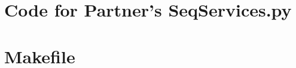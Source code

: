 \documentclass[12pt]{article}
\begin{document}
\noindent 

\newpage

\section{Code for Partner's SeqServices.py}

\noindent 

\newpage

\section{Makefile}

\lstset{language=make}
\noindent 
\end{document}
